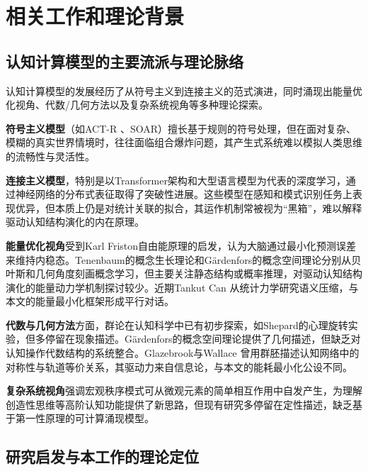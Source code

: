 \documentclass[12pt,a4paper]{article}
\begin{document}
\section{相关工作和理论背景}

\subsection{认知计算模型的主要流派与理论脉络}

认知计算模型的发展经历了从符号主义到连接主义的范式演进，同时涌现出能量优化视角、代数/几何方法以及复杂系统视角等多种理论探索。

\textbf{符号主义模型}（如ACT-R \cite{anderson2004act}、SOAR）擅长基于规则的符号处理，但在面对复杂、模糊的真实世界情境时，往往面临组合爆炸问题，其产生式系统难以模拟人类思维的流畅性与灵活性。

\textbf{连接主义模型}，特别是以Transformer架构\cite{vaswani2017attention}和大型语言模型为代表的深度学习\cite{lecun2015deep}，通过神经网络的分布式表征取得了突破性进展。这些模型在感知和模式识别任务上表现优异，但本质上仍是对统计关联的拟合，其运作机制常被视为“黑箱”，难以解释驱动认知结构演化的内在原理。

\textbf{能量优化视角}受到Karl Friston自由能原理\cite{friston2010free}的启发，认为大脑通过最小化预测误差来维持内稳态。Tenenbaum的概念生长理论\cite{tenenbaum2011grow}和Gärdenfors的概念空间理论\cite{gardenfors2004conceptual}分别从贝叶斯和几何角度刻画概念学习，但主要关注静态结构或概率推理，对驱动认知结构演化的能量动力学机制探讨较少。近期Tankut Can \cite{can2025statistical}从统计力学研究语义压缩，与本文的能量最小化框架形成平行对话。

\textbf{代数与几何方法}方面，群论\cite{rotman1995theory}在认知科学中已有初步探索，如Shepard的心理旋转实验，但多停留在现象描述。Gärdenfors的概念空间理论提供了几何描述，但缺乏对认知操作代数结构的系统整合。Glazebrook与Wallace \cite{glazebrook2009small}曾用群胚描述认知网络中的对称性与轨道等价关系，其驱动力来自信息论，与本文的能耗最小化公设不同。

\textbf{复杂系统视角}强调宏观秩序模式可从微观元素的简单相互作用中自发产生，为理解创造性思维等高阶认知功能提供了新思路，但现有研究多停留在定性描述，缺乏基于第一性原理的可计算涌现模型。

\subsection{研究启发与本工作的理论定位}
\label{subsec:research_gaps_positioning}
\end{document}
